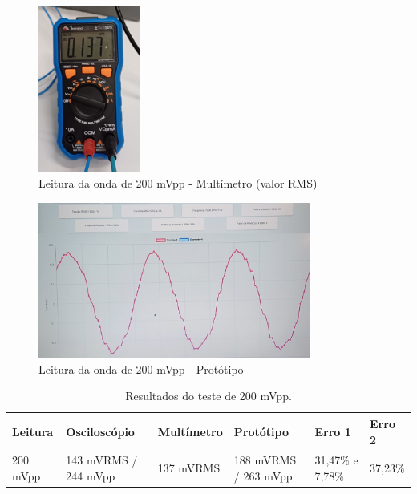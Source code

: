 \begin{figure}[htb!]
    \caption{Leitura da onda de 200 mVpp - Multímetro (valor RMS)}
    \label{fig:leitura-200-mult}
    \includegraphics[width=0.3\textwidth]{figuras/leitura-200-mult.png}
    \fonte{}
\end{figure}

\begin{figure}[htb!]
    \caption{Leitura da onda de 200 mVpp - Protótipo}
    \label{fig:leitura-200-boy-onda}
    \includegraphics[width=0.8\textwidth]{figuras/leitura-200-boy-onda.png}
    \fonte{}
\end{figure}

\begin{table}[!ht]
    \centering
    \caption{Resultados do teste de 200 mVpp.}
    \label{tab:resultados}
    \begin{tabular}{|p{2cm}|p{3cm}|p{2cm}|p{2cm}|p{2cm}|p{2cm}|}
        \hline
        \textbf{Leitura} & \textbf{Osciloscópio} & \textbf{Multímetro} & \textbf{Protótipo}    & \textbf{Erro 1}  & \textbf{Erro 2}   \\ \hline
        200 mVpp         & 143 mVRMS / 244 mVpp & 137 mVRMS          & 188 mVRMS / 263 mVpp & 31,47\% e 7,78\% & 37,23\%           \\ \hline
    \end{tabular}
\end{table}

